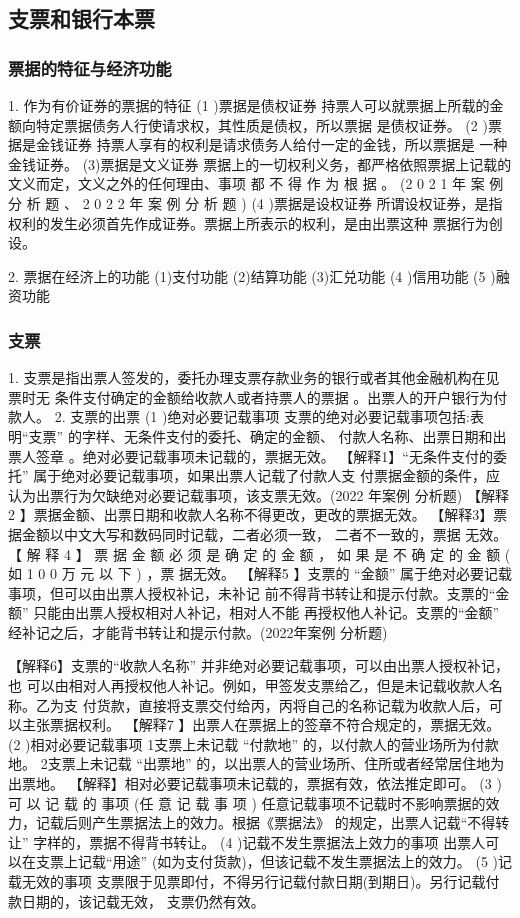 \documentclass[UTF8,12pt]{ctexart}
\numberwithin{equation}{section} %
\numberwithin{figure}{section}
\numberwithin{table}{section}
\begin{document}
	\subsection{支票和银行本票}
	\subsubsection{票据的特征与经济功能} 
	1. 作为有价证券的票据的特征
	(1 )票据是债权证券 持票人可以就票据上所载的金额向特定票据债务人行使请求权，其性质是债权，所以票据 是债权证券。
	(2 )票据是金钱证券
	持票人享有的权利是请求债务人给付一定的金钱，所以票据是 一种金钱证券。 (3)票据是文义证券 票据上的一切权利义务，都严格依照票据上记载的文义而定，文义之外的任何理由、事项 都 不 得 作 为 根 据 。 (2 0 2 1 年 案 例 分 析 题 、 2 0 2 2 年 案 例 分 析 题 )
	(4 )票据是设权证券 所谓设权证券，是指权利的发生必须首先作成证券。票据上所表示的权利，是由出票这种 票据行为创设。
	
	2. 票据在经济上的功能 (1)支付功能 (2)结算功能 (3)汇兑功能
	(4 )信用功能
	(5 )融资功能
	
	
	
	
	\subsubsection{支票}
	1. 支票是指出票人签发的，委托办理支票存款业务的银行或者其他金融机构在见票时无 条件支付确定的金额给收款人或者持票人的票据 。出票人的开户银行为付款人。
	2. 支票的出票
	(1 )绝对必要记载事项
	支票的绝对必要记载事项包括:表明“支票” 的字样、无条件支付的委托、确定的金额、 付款人名称、出票日期和出票人签章 。绝对必要记载事项未记载的，票据无效。
	【解释1】“无条件支付的委托” 属于绝对必要记载事项，如果出票人记载了付款人支 付票据金额的条件，应认为出票行为欠缺绝对必要记载事项，该支票无效。(2022 年案例 分析题)
	【解释2 】票据金额、出票日期和收款人名称不得更改，更改的票据无效。 【解释3】票据金额以中文大写和数码同时记载，二者必须一致， 二者不一致的，票据 无效。
	【 解 释 4 】 票 据 金 额 必 须 是 确 定 的 金 额 ， 如 果 是 不 确 定 的 金 额 ( 如 1 0 0 万 元 以 下 ) ，票 据无效。
	【解释5 】支票的 “金额” 属于绝对必要记载事项，但可以由出票人授权补记，未补记 前不得背书转让和提示付款。支票的“金额” 只能由出票人授权相对人补记，相对人不能 再授权他人补记。支票的“金额” 经补记之后，才能背书转让和提示付款。(2022年案例 分析题)
	
	【解释6】支票的“收款人名称” 并非绝对必要记载事项，可以由出票人授权补记，也 可以由相对人再授权他人补记。例如，甲签发支票给乙，但是未记载收款人名称。乙为支 付货款，直接将支票交付给丙，丙将自己的名称记载为收款人后，可以主张票据权利。 【解释7 】出票人在票据上的签章不符合规定的，票据无效。
	(2 )相对必要记载事项
	1支票上未记载 “付款地” 的，以付款人的营业场所为付款地。
	2支票上未记载 “出票地” 的，以出票人的营业场所、住所或者经常居住地为出票地。
	【解释】相对必要记载事项未记载的，票据有效，依法推定即可。
	(3 )可 以 记 载 的 事项 (任 意 记 载 事 项 ) 任意记载事项不记载时不影响票据的效力，记载后则产生票据法上的效力。根据《票据法》 的规定，出票人记载“不得转让” 字样的，票据不得背书转让。
	(4 )记载不发生票据法上效力的事项
	出票人可以在支票上记载“用途” (如为支付货款)，但该记载不发生票据法上的效力。
	(5 )记载无效的事项 支票限于见票即付，不得另行记载付款日期(到期日)。另行记载付款日期的，该记载无效， 支票仍然有效。
	
\end{document}
